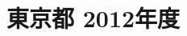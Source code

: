 \documentclass[../../hsm_tok_q.tex]{subfiles}
\begin{document}
    \section{東京都 2012年度}
    \subsection{　}
    
    \newpage
    \subsection{　}
    
    \newpage
    \subsection{　}
    
    \newpage
    \subsection{　}
    
    \newpage
    \subsection{　}
    
\end{document}
